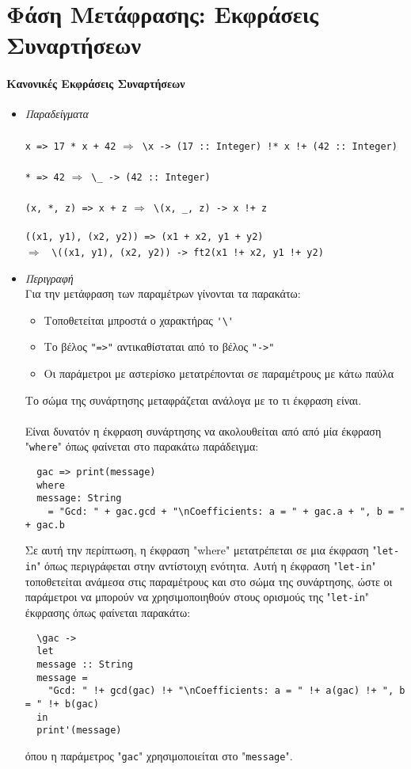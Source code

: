 \documentclass[diploma]{softlab-thesis}
\def\lra{$\Longrightarrow$\ }
\begin{document}
\newpage

\section{Φάση Μετάφρασης: Εκφράσεις Συναρτήσεων}

\paragraph{Κανονικές Εκφράσεις Συναρτήσεων}

\begin{itemize}
\item
\textit{Παραδείγματα}\\\\
\verb|x => 17 * x + 42| \lra \verb|\x -> (17 :: Integer) !* x !+ (42 :: Integer)|
\\\\
\verb|* => 42| \lra \verb|\_ -> (42 :: Integer)|
\\\\
\verb|(x, *, z) => x + z| \lra \verb|\(x, _, z) -> x !+ z|
\\\\
\verb|((x1, y1), (x2, y2)) => (x1 + x2, y1 + y2)|\\
\lra
\verb|\((x1, y1), (x2, y2)) -> ft2(x1 !+ x2, y1 !+ y2)|\\

\item
\textit{Περιγραφή}\\

Για την μετάφραση των παραμέτρων γίνονται τα παρακάτω:
\begin{itemize}
\item
Τοποθετείται μπροστά ο χαρακτήρας \verb|'\'|
\item
Το βέλος \verb|"=>"| αντικαθίσταται από το βέλος \verb|"->"|
\item
Οι παράμετροι με αστερίσκο μετατρέπονται σε παραμέτρους με κάτω παύλα
\end{itemize}
Το σώμα της συνάρτησης μεταφράζεται ανάλογα με το τι έκφραση είναι.
\\\\
Είναι δυνατόν η έκφραση συνάρτησης να ακολουθείται από από μία έκφραση
"\texttt{where}" όπως φαίνεται στο παρακάτω παράδειγμα:
\begin{verbatim}
  gac => print(message)
  where
  message: String
    = "Gcd: " + gac.gcd + "\nCoefficients: a = " + gac.a + ", b = " + gac.b
\end{verbatim}
Σε αυτή την περίπτωση, η έκφραση "where" μετατρέπεται σε μια έκφραση
"\texttt{let-in}" όπως περιγράφεται στην αντίστοιχη ενότητα. Αυτή η έκφραση
"\texttt{let-in}" τοποθετείται ανάμεσα στις παραμέτρους και στο σώμα της
συνάρτησης, ώστε οι παράμετροι να μπορούν να χρησιμοποιηθούν στους ορισμούς
της "\texttt{let-in}" έκφρασης όπως φαίνεται παρακάτω:
\begin{verbatim}
  \gac ->
  let
  message :: String
  message =
    "Gcd: " !+ gcd(gac) !+ "\nCoefficients: a = " !+ a(gac) !+ ", b = " !+ b(gac)
  in
  print'(message)
\end{verbatim}
όπου η παράμετρος "\verb|gac|" χρησιμοποιείται στο "\verb|message|".

\end{itemize}
\end{document}
